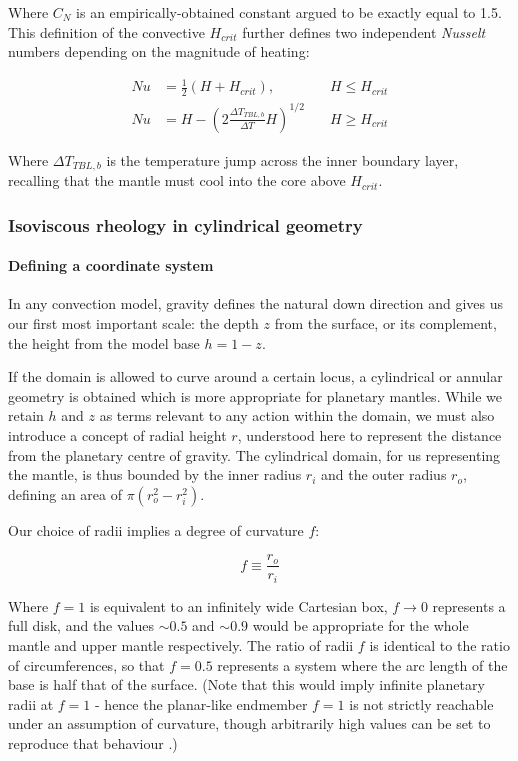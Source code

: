 \documentclass[a4paper,11pt,oneside]{book}
\begin{document}
Where $C_N$ is an empirically-obtained constant argued to be exactly equal to 1.5. This definition of the convective $H_{crit}$ further defines two independent \textit{Nusselt} numbers depending on the magnitude of heating:

\begin{align*}
Nu &= \frac{1}{2} \left( H + H_{crit} \right), \quad &H \le H_{crit} \\
Nu &=  H - {\left( 2 \frac{{\Delta T}_{TBL,b}}{\Delta T} H \right)}^{1/2} \quad &H \ge H_{crit}
\end{align*}

Where ${\Delta T}_{TBL,b}$ is the temperature jump across the inner boundary layer, recalling that the mantle must cool into the core above $H_{crit}$.

\subsubsection{Isoviscous rheology in cylindrical geometry}

\paragraph{Defining a coordinate system}

In any convection model, gravity defines the natural down direction and gives us our first most important scale: the depth $z$ from the surface, or its complement, the height from the model base $h=1 -z$.

If the domain is allowed to curve around a certain locus, a cylindrical or annular geometry is obtained which is more appropriate for planetary mantles. While we retain $h$ and $z$ as terms relevant to any action within the domain, we must also introduce a concept of radial height $r$, understood here to represent the distance from the planetary centre of gravity. The cylindrical domain, for us representing the mantle, is thus bounded by the inner radius $r_{i}$ and the outer radius $r_{o}$, defining an area of $\pi(r_o^2 - r_i^2)$.

Our choice of radii implies a degree of curvature $f$:

\begin{equation}
f \equiv \frac{r_o}{r_i}
\end{equation}

Where $f=1$ is equivalent to an infinitely wide Cartesian box, $f\to0$ represents a full disk, and the values $\sim 0.5$ and $\sim 0.9$ would be appropriate for the whole mantle and upper mantle respectively. The ratio of radii $f$ is identical to the ratio of circumferences, so that $f=0.5$ represents a system where the arc length of the base is half that of the surface. (Note that this would imply infinite planetary radii at $f=1$ - hence the planar-like endmember $f=1$ is not strictly reachable under an assumption of curvature, though arbitrarily high values can be set to reproduce that behaviour \cite{Jarvis1993-cb}.)
\end{document}
